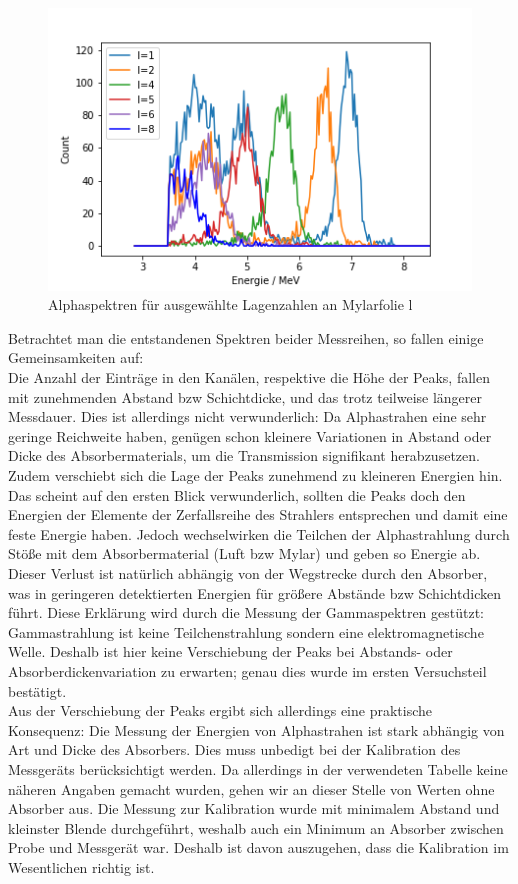 \begin{figure}[h]
    \centering
    \includegraphics[scale=0.75]{Bilder/lagenAusgewaehlt.png}
    \caption{Alphaspektren für ausgewählte Lagenzahlen an Mylarfolie l}
    \label{bild:lagenAusgewaehlt}
\end{figure}

\clearpage

Betrachtet man die entstandenen Spektren beider Messreihen, so fallen einige Gemeinsamkeiten auf:\\
Die Anzahl der Einträge in den Kanälen, respektive die Höhe der Peaks, fallen mit zunehmenden Abstand bzw Schichtdicke, und das trotz 
teilweise längerer Messdauer. Dies ist allerdings nicht verwunderlich: Da Alphastrahen eine sehr geringe Reichweite haben, genügen schon 
kleinere Variationen in Abstand oder Dicke des Absorbermaterials, um die Transmission signifikant herabzusetzen.\\
Zudem verschiebt sich die Lage der Peaks zunehmend zu kleineren Energien hin. Das scheint auf den ersten Blick verwunderlich, sollten 
die Peaks doch den Energien der Elemente der Zerfallsreihe des Strahlers entsprechen und damit eine feste Energie haben. Jedoch 
wechselwirken die Teilchen der Alphastrahlung durch Stöße mit dem Absorbermaterial (Luft bzw Mylar) und geben so Energie ab. Dieser 
Verlust ist natürlich abhängig von der Wegstrecke durch den Absorber, was in geringeren detektierten Energien für größere Abstände 
bzw Schichtdicken führt. Diese Erklärung wird durch die Messung der Gammaspektren gestützt: Gammastrahlung ist keine Teilchenstrahlung 
sondern eine elektromagnetische Welle. Deshalb ist hier keine Verschiebung der Peaks bei Abstands- oder Absorberdickenvariation zu 
erwarten; genau dies wurde im ersten Versuchsteil bestätigt.\\
Aus der Verschiebung der Peaks ergibt sich allerdings eine praktische Konsequenz: Die Messung der Energien von Alphastrahen ist stark 
abhängig von Art und Dicke des Absorbers. Dies muss unbedigt bei der Kalibration des Messgeräts berücksichtigt werden. Da allerdings 
in der verwendeten Tabelle keine näheren Angaben gemacht wurden, gehen wir an dieser Stelle von Werten ohne Absorber aus. Die Messung 
zur Kalibration wurde mit minimalem Abstand und kleinster Blende durchgeführt, weshalb auch ein Minimum an Absorber zwischen Probe 
und Messgerät war. Deshalb ist davon auszugehen, dass die Kalibration im Wesentlichen richtig ist.\\

